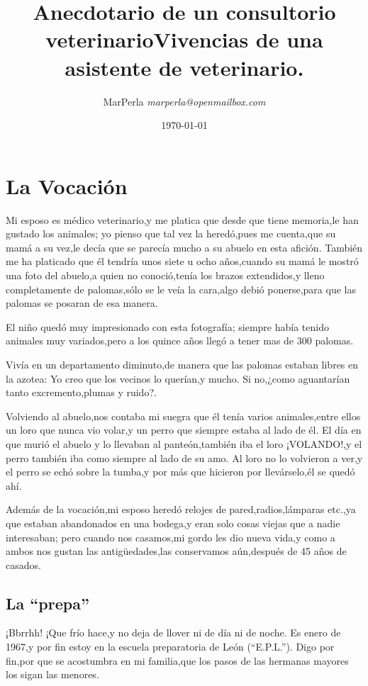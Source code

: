 \documentclass[letterpaper,12pt]{book}
\title{{\sffamily \huge Anecdotario de un consultorio veterinario}{\calligra{}Vivencias de una asistente de veterinario.}}
\author{{\Large  MarPerla }\textit{marperla@openmailbox.com }}
\date{\today}
\begin{document}
\maketitle
\tableofcontents
\chapter{La Vocación}
Mi esposo es médico veterinario,y me platica que desde que tiene memoria,le han gustado los animales; yo pienso que tal vez la heredó,pues me cuenta,que su mamá a su vez,le decía que se parecía mucho a su abuelo en esta afición. También me ha platicado que él tendría unos siete u ocho años,cuando su mamá le mostró una foto del abuelo,a quien no conoció,tenía los brazos extendidos,y lleno completamente de palomas,sólo se le veía la cara,algo debió ponerse,para que las palomas se posaran de esa manera. 

El niño quedó muy impresionado con esta fotografía; siempre había tenido animales muy variados,pero a los quince años llegó a tener mas de 300 palomas. 

Vivía en un departamento diminuto,de manera que las palomas estaban libres en la azotea: Yo creo que los vecinos lo querían,y mucho. Si no,¿como aguantarían tanto excremento,plumas y ruido?.

Volviendo al  abuelo,nos contaba mi suegra que él tenía varios animales,entre ellos un loro que nunca vio volar,y un perro que siempre estaba al lado de él. El día en que murió el abuelo y lo llevaban al panteón,también iba el loro ¡VOLANDO!,y el perro también iba como siempre al lado de su amo. Al loro no lo volvieron a ver,y el perro se echó sobre la tumba,y por más que hicieron por llevárselo,él se quedó ahí. 

Además de la vocación,mi esposo heredó relojes de pared,radios,lámparas etc.,ya que estaban abandonados en una bodega,y eran solo cosas viejas que a nadie interesaban; pero cuando nos casamos,mi gordo les dio nueva vida,y como a ambos nos gustan las antigüedades,las conservamos aún,después de 45 años de casados.
\section*{La ``prepa''}
¡Bbrrhh! ¡Que frío hace,y no deja de llover ni de día ni de noche. Es enero de 1967,y por fin estoy en la escuela preparatoria de León (``E.P.L.''). Digo por fin,por que se acostumbra en mi familia,que los pasos de las hermanas mayores los sigan las menores.
\end{document}
